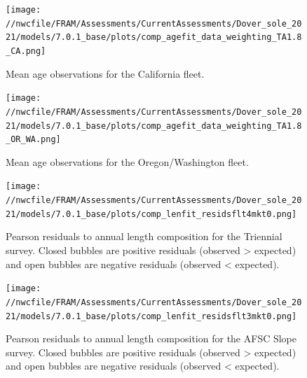 \documentclass[11pt,
  english,
  a4paper,
]{article}
\begin{document}
\tagmcend\tagstructend


\begin{figure}
\centering
\texttt{[image: //nwcfile/FRAM/Assessments/CurrentAssessments/Dover\_sole\_2021/models/7.0.1\_base/plots/comp\_agefit\_data\_weighting\_TA1.8\_CA.png]}
\caption{Mean age observations for the California fleet.\label{fig:ca-mean-age}}
\end{figure}

\tagmcend\tagstructend


\begin{figure}
\centering
\texttt{[image: //nwcfile/FRAM/Assessments/CurrentAssessments/Dover\_sole\_2021/models/7.0.1\_base/plots/comp\_agefit\_data\_weighting\_TA1.8\_OR\_WA.png]}
\caption{Mean age observations for the Oregon/Washington fleet.\label{fig:orwa-mean-age}}
\end{figure}

\tagmcend\tagstructend


\begin{figure}
\centering
\texttt{[image: //nwcfile/FRAM/Assessments/CurrentAssessments/Dover\_sole\_2021/models/7.0.1\_base/plots/comp\_lenfit\_residsflt4mkt0.png]}
\caption{Pearson residuals to annual length composition for the Triennial survey. Closed bubbles are positive residuals (observed \textgreater{} expected) and open bubbles are negative residuals (observed \textless{} expected).\label{fig:tri-pearson}}
\end{figure}

\tagmcend\tagstructend


\begin{figure}
\centering
\texttt{[image: //nwcfile/FRAM/Assessments/CurrentAssessments/Dover\_sole\_2021/models/7.0.1\_base/plots/comp\_lenfit\_residsflt3mkt0.png]}
\caption{Pearson residuals to annual length composition for the AFSC Slope survey. Closed bubbles are positive residuals (observed \textgreater{} expected) and open bubbles are negative residuals (observed \textless{} expected).\label{fig:afsc-pearson}}
\end{figure}
\end{document}
